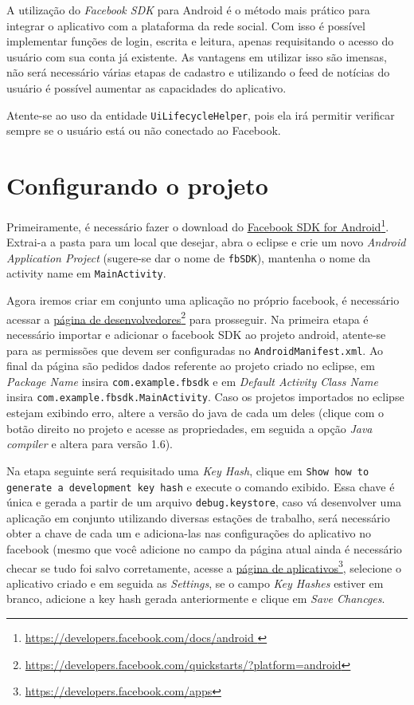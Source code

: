 \documentclass[a4paper,12pt,brazil,oneside]{book}
\begin{document}
	A utilização do \emph{Facebook SDK} para Android é o método mais prático para integrar o aplicativo com a plataforma da rede social. Com isso é possível implementar funções de login, escrita e leitura, apenas requisitando o acesso do usuário com sua conta já existente. As vantagens em utilizar isso são imensas, não será necessário várias etapas de cadastro e utilizando o feed de notícias do usuário é possível aumentar as capacidades do aplicativo.
		
	Atente-se ao uso da entidade \texttt{UiLifecycleHelper}, pois ela irá permitir verificar sempre se o usuário está ou não conectado ao Facebook.

\section{Configurando o projeto}

	Primeiramente, é necessário fazer o download do \href{https://developers.facebook.com/docs/android}{Facebook SDK for Android}\footnote{\href{https://developers.facebook.com/docs/android}{https://developers.facebook.com/docs/android }}.
	Extrai-a a pasta para um local que desejar, abra o eclipse e crie um novo \emph{Android Application Project} (sugere-se dar o nome de \texttt{fbSDK}), mantenha o nome da activity name em \texttt{MainActivity}. 
	
	Agora iremos criar em conjunto uma aplicação no próprio facebook, é necessário acessar a \href{https://developers.facebook.com/quickstarts/?platform=android}{página de desenvolvedores}\footnote{\href{https://developers.facebook.com/quickstarts/?platform=android}{https://developers.facebook.com/quickstarts/?platform=android}} para prosseguir.
	Na primeira etapa é necessário importar e adicionar o facebook SDK ao projeto android, atente-se para as permissões que devem ser configuradas no \texttt{AndroidManifest.xml}. Ao final da página são pedidos dados referente ao projeto criado no eclipse, em \emph{Package Name} insira \texttt{com.example.fbsdk} e em \emph{Default Activity Class Name} insira \texttt{com.example.fbsdk.MainActivity}.
	Caso os projetos importados no eclipse estejam exibindo erro, altere a versão do java de cada um deles (clique com o botão direito no projeto e acesse as propriedades, em seguida a opção \emph{Java compiler} e altera para versão 1.6).
	
	Na etapa seguinte será requisitado uma \emph{Key Hash}, clique em \texttt{Show how to generate a development key hash} e execute o comando exibido. Essa chave é única e gerada a partir de um arquivo \texttt{debug.keystore}, caso vá desenvolver uma aplicação em conjunto utilizando diversas estações de trabalho, será necessário obter a chave de cada um e adiciona-las nas configurações do aplicativo no facebook (mesmo que você adicione no campo da página atual ainda é necessário checar se tudo foi salvo corretamente, acesse a \href{https://developers.facebook.com/apps}{página de aplicativos}\footnote{\href{https://developers.facebook.com/apps}{https://developers.facebook.com/apps}}, selecione o aplicativo criado e em seguida as \emph{Settings}, se o campo \emph{Key Hashes} estiver em branco, adicione a key hash gerada anteriormente e clique em \emph{Save Chancges}.
	
\end{document}
